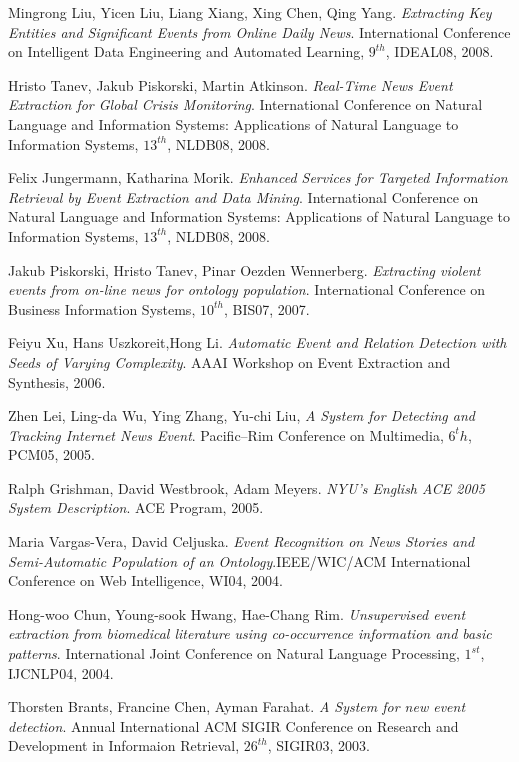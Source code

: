 \begin{thebibliography}{99}
		 	Mingrong Liu, Yicen Liu, Liang Xiang, Xing Chen, Qing Yang. \emph{Extracting Key Entities and Significant Events from Online Daily News}. International Conference on Intelligent Data Engineering and Automated Learning, $9^{th}$, IDEAL08, 2008. 	

		 	Hristo Tanev, Jakub Piskorski, Martin Atkinson. \emph{Real-Time News Event Extraction for Global Crisis Monitoring}. International Conference on Natural Language and Information Systems: Applications of Natural Language to Information Systems, $13^{th}$, NLDB08, 2008.

		  Felix Jungermann, Katharina Morik.  \emph{Enhanced Services for Targeted Information Retrieval by Event Extraction and Data Mining}. International Conference on Natural Language and Information Systems: Applications of Natural Language to Information Systems, $13^{th}$, NLDB08, 2008. 

		  	Jakub Piskorski, Hristo Tanev, Pinar Oezden Wennerberg. \emph{Extracting violent events from on-line news for ontology population}.  International Conference on Business Information Systems, $10^{th}$, BIS07, 2007. 

		 Feiyu Xu, Hans Uszkoreit,Hong Li. \emph{Automatic Event and Relation Detection
with Seeds of Varying Complexity}. AAAI Workshop on Event Extraction and Synthesis, 2006.
		
		 Zhen Lei, Ling-da Wu, Ying Zhang, Yu-chi Liu, \emph{A System for Detecting and Tracking Internet News Event}. Pacific--Rim Conference on Multimedia, $6^th$, PCM05, 2005.

		 Ralph Grishman, David Westbrook, Adam Meyers. \emph{NYU's English ACE 2005 System Description}. ACE Program, 2005. 


		 	Maria Vargas-Vera, David Celjuska. \emph{Event Recognition on News Stories and Semi-Automatic Population of an Ontology}.IEEE/WIC/ACM International Conference on Web Intelligence, WI04, 2004.


		  	Hong-woo Chun, Young-sook Hwang, Hae-Chang Rim. \emph{Unsupervised event extraction from biomedical literature using co-occurrence information and basic patterns}. International Joint Conference on Natural Language Processing, $1^{st}$, IJCNLP04, 2004. 
   
		 Thorsten Brants, Francine Chen, Ayman Farahat. \emph{A System for new event detection}. Annual International ACM SIGIR Conference on Research and Development in Informaion Retrieval, $26^{th}$, SIGIR03, 2003.


\end{thebibliography}

